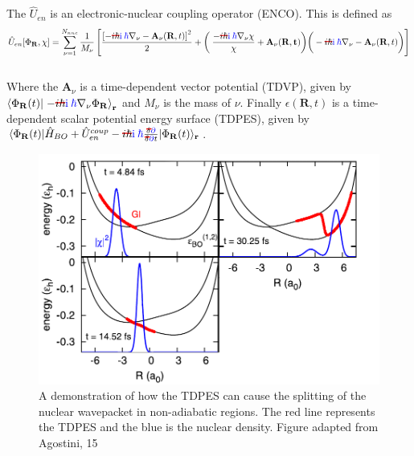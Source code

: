 \\\\
The $\hat{U}_{en}$ is an electronic-nuclear coupling operator (ENCO). This is defined as \begin{equation}
  \hat{U}_{en}[\Phi_{\mathbf{R}}, \chi] = \sum_{\nu=1}^{N_{nuc}} \frac{1}{M_{\nu}} \left[ \frac{\left[-\mremove{i \hbar}\madd{\im \: \hbar} \nabla_{\nu} - \mathbf{A}_{\nu}(\mathbf{R}, t) \right]^2}{2} + \left( \left. \left. \frac{-\mremove{i \hbar}\madd{\im \: \hbar} \nabla_{\nu} \chi}{\chi} + \mathbf{A}_{\nu}(\mathbf{R, t})\right)\right( -\mremove{i \hbar}\madd{\im \: \hbar}\nabla_{\nu} -            \mathbf{A}_{\nu}(\mathbf{R}, t)\right) \right]
  \label{eq:ENCO}
\end{equation}
\\
Where the $\mathbf{A}_{\nu}$ is a time-dependent vector potential (TDVP), given by $\left\langle \Phi_{\mathbf{R}}(t) \right\vert \left. - \mremove{i \hbar}\madd{\im \: \hbar} \nabla_{\nu} \Phi_{\mathbf{R}} \right\rangle_{\mathbf{r}}$  and $M_{\nu}$ is the mass of  $\nu$.
Finally $\epsilon(\mathbf{R}, t)$ is a time-dependent scalar potential energy surface (TDPES), given by $\langle \Phi_{\mathbf{R}}(t) \vert \hat{H}_{BO} + \hat{U}_{en}^{coup} - \mremove{i \hbar}\madd{\im \: \hbar} \frac{\mremove{\delta}\madd{\partial}}{\mremove{\delta}\madd{\partial} t} \vert \Phi_{\mathbf{R}}(t) \rangle_{\mathbf{r}}$.
\\
\begin{figure}[htp]
  \includegraphics[width=\textwidth]{../img/CTMQC/nuclear_splitting_TDPES.png}
  \caption{A demonstration of how the TDPES can cause the splitting of the nuclear wavepacket in non-adiabatic regions. The red line represents the TDPES and the blue is the nuclear density. Figure adapted from Agostini, 15 \cite{agostini_exact_2015} \label{fig:step_TDPES}}
\end{figure}
